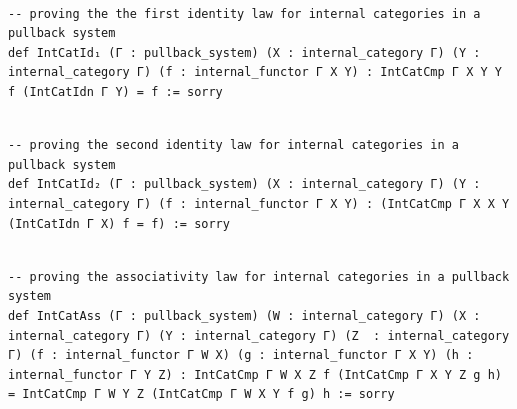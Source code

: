 \documentclass{book}
\theoremstyle{definition}
\newcounter{lcounter}
\begin{document}
\begin{center}
\begin{tcolorbox}[width=5in,colback={white},title={\begin{center}\texttt{Lean \thelcounter} \addtocounter{lcounter}{1}  \end{center}},colbacktitle=Blue,coltitle=black]
\begin{verbatim}

-- proving the the first identity law for internal categories in a pullback system
def IntCatId₁ (Γ : pullback_system) (X : internal_category Γ) (Y : internal_category Γ) (f : internal_functor Γ X Y) : IntCatCmp Γ X Y Y f (IntCatIdn Γ Y) = f := sorry

\end{verbatim}
\end{tcolorbox}
\end{center}

\begin{center}
\begin{tcolorbox}[width=5in,colback={white},title={\begin{center}\texttt{Lean \thelcounter} \addtocounter{lcounter}{1}  \end{center}},colbacktitle=Blue,coltitle=black]
\begin{verbatim}

-- proving the second identity law for internal categories in a pullback system
def IntCatId₂ (Γ : pullback_system) (X : internal_category Γ) (Y : internal_category Γ) (f : internal_functor Γ X Y) : (IntCatCmp Γ X X Y (IntCatIdn Γ X) f = f) := sorry

\end{verbatim}
\end{tcolorbox}
\end{center}

\begin{center}
\begin{tcolorbox}[width=5in,colback={white},title={\begin{center}\texttt{Lean \thelcounter} \addtocounter{lcounter}{1}  \end{center}},colbacktitle=Blue,coltitle=black]
\begin{verbatim}

-- proving the associativity law for internal categories in a pullback system
def IntCatAss (Γ : pullback_system) (W : internal_category Γ) (X : internal_category Γ) (Y : internal_category Γ) (Z  : internal_category Γ) (f : internal_functor Γ W X) (g : internal_functor Γ X Y) (h : internal_functor Γ Y Z) : IntCatCmp Γ W X Z f (IntCatCmp Γ X Y Z g h) = IntCatCmp Γ W Y Z (IntCatCmp Γ W X Y f g) h := sorry

\end{verbatim}
\end{tcolorbox}
\end{center}
\end{document}
